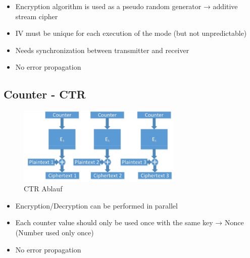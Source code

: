 \begin{itemize}
    \item Encryption algorithm is used as a pseudo random generator → additive stream cipher
    \item IV must be unique for each execution of the mode (but not unpredictable)
    \item Needs synchronization between transmitter and receiver
    \item No error propagation
\end{itemize}

\hypertarget{counter---ctr}{%
\subsection{Counter - CTR}\label{counter---ctr}}

\begin{figure}[H]
\centering
\includegraphics[width=0.7\textwidth]{figures/CTR.png}
\caption{CTR Ablauf}
\end{figure}

\begin{itemize}
    \item Encryption/Decryption can be performed in parallel
    \item Each counter value should only be used once with the same key → Nonce (Number used only once)
    \item No error propagation
\end{itemize}

\clearpage
